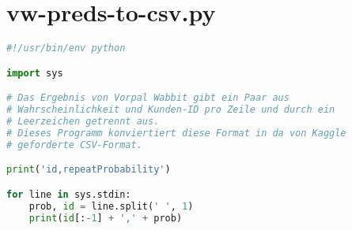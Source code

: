 \section{vw-preds-to-csv.py}
\label{code:vw-preds-to-csv}
\begin{lstlisting}[language=Python]
#!/usr/bin/env python

import sys

# Das Ergebnis von Vorpal Wabbit gibt ein Paar aus 
# Wahrscheinlichkeit und Kunden-ID pro Zeile und durch ein
# Leerzeichen getrennt aus.
# Dieses Programm konviertiert diese Format in da von Kaggle
# geforderte CSV-Format.

print('id,repeatProbability')

for line in sys.stdin:
	prob, id = line.split(' ', 1)
	print(id[:-1] + ',' + prob)
\end{lstlisting}
	
	